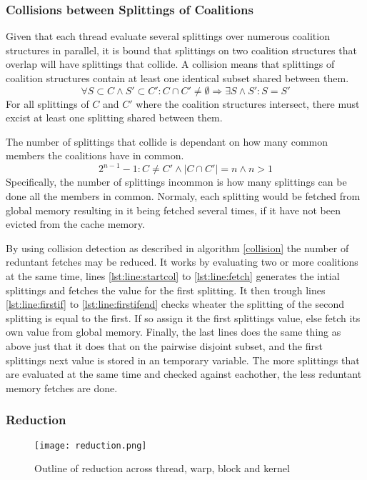 \documentclass{aamas2012}
\begin{document}
\subsubsection{Collisions between Splittings of Coalitions} \label{sectionsplit}
Given that each thread evaluate several splittings over numerous coalition structures in parallel, 
it is bound that splittings on two coalition structures that overlap will have splittings that collide.
A collision means that splittings of coalition structures contain at least one identical subset shared between them.
\begin{displaymath}\forall S\subset C \wedge S' \subset C' : C \cap C' \neq \emptyset \Rightarrow \exists S \wedge S' : S = S'\end{displaymath}
For all splittings of $C$ and $C'$ where the coalition structures intersect, there must excist at least one splitting shared between them.

The number of splittings that collide is dependant on how many common members the coalitions have in common.
\begin{displaymath}2^{n-1}-1:C\neq C'\wedge |C \cap C'| = n \wedge n > 1 \end{displaymath}
Specifically, the number of splittings incommon is how many splittings
can be done all the members in common.
Normaly, each splitting would be fetched from global memory resulting in it being fetched several times, 
if it have not been evicted from the cache memory.

By using collision detection as described in algorithm \ref{collision} the number of reduntant fetches may be reduced.
It works by evaluating two or more coalitions at the same time, lines \ref{lst:line:startcol} to \ref{lst:line:fetch} generates
the intial splittings and fetches the value for the first splitting. It then trough lines \ref{lst:line:firstif} to \ref{lst:line:firstifend}
checks wheater the splitting of the second splitting is equal to the first. 
If so assign it the first splittings value, else fetch its own value from global memory. 
Finally, the last lines does the same thing as above just that it does that on the pairwise disjoint subset, 
and the first splittings next value is stored in an temporary variable. 
The more splittings that are evaluated at the same time and checked against eachother, the less reduntant memory fetches are done.


\subsubsection{Reduction} \label{reduction} %
\begin{figure*}
\centering
\texttt{[image: reduction.png]}
\caption{Outline of reduction across thread, warp, block and kernel \label{fig:reduction}}
\end{figure*}
\end{document}

